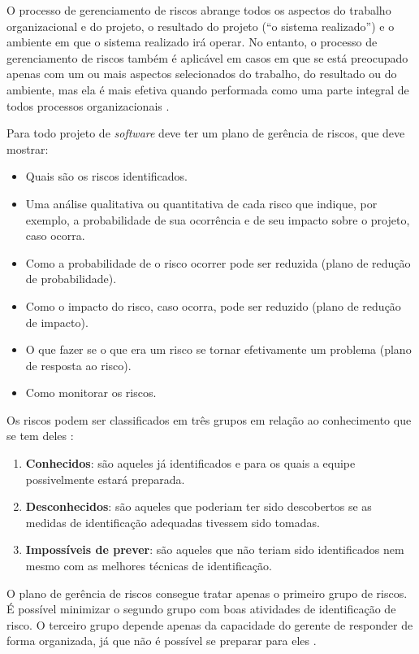 \documentclass[
	12pt,
	openright,
	twoside,
	a4paper,
	english,
	brazil
	]{abntex2}
\begin{document}
O processo de gerenciamento de riscos abrange todos os aspectos do trabalho organizacional e do projeto, o resultado do projeto (“o sistema realizado”) e o ambiente em que o sistema realizado irá operar. No entanto, o processo de gerenciamento de riscos também é aplicável em casos em que se está preocupado apenas com um ou mais aspectos selecionados do trabalho, do resultado ou do ambiente, mas ela é mais efetiva quando performada como uma parte integral de todos processos organizacionais \cite{iso16085}.

Para  todo projeto de \textit{software} deve ter um plano de gerência de riscos, que deve mostrar:

\begin{itemize}
  \item Quais são os riscos identificados.
  \item Uma análise qualitativa ou quantitativa de cada risco que indique, por exemplo, a probabilidade de sua ocorrência e de seu impacto sobre o projeto, caso ocorra.
  \item Como a probabilidade de o risco ocorrer pode ser reduzida (plano de redução de probabilidade).
  \item Como o impacto do risco, caso ocorra, pode ser reduzido (plano de redução de impacto).
  \item O que fazer se o que era um risco se tornar efetivamente um problema (plano de resposta ao risco).
  \item Como monitorar os riscos.
\end{itemize}

Os riscos podem ser classificados em três grupos em relação ao conhecimento que se tem deles \cite{wazlawick2019}:

\begin{enumerate}
  \item \textbf{Conhecidos}: são aqueles já identificados e para os quais a equipe possivelmente estará preparada.
  \item \textbf{Desconhecidos}: são aqueles que poderiam ter sido descobertos se as medidas de identificação adequadas tivessem sido tomadas.
  \item \textbf{Impossíveis de prever}: são aqueles que não teriam sido identificados nem mesmo com as melhores técnicas de identificação.
\end{enumerate}

O plano de gerência de riscos consegue tratar apenas o primeiro grupo de riscos. É possível minimizar o segundo grupo com boas atividades de identificação de risco. O terceiro grupo depende apenas da capacidade do gerente de responder de forma organizada, já que não é possível se preparar para eles \cite{wazlawick2019}.
\end{document}
